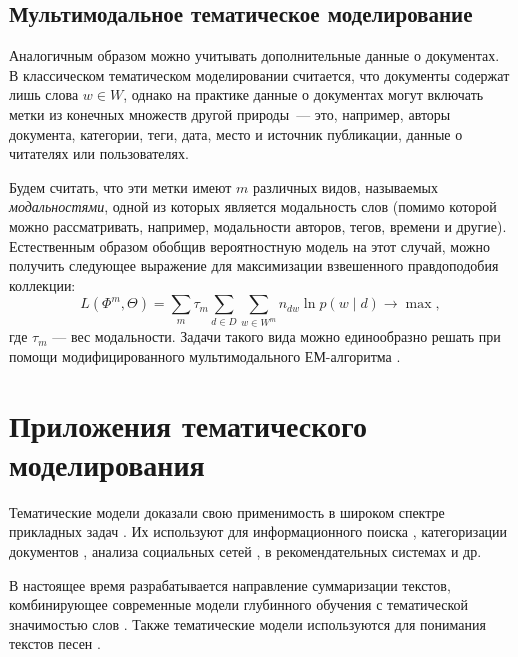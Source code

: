 \subsection{Мультимодальное тематическое моделирование}

Аналогичным образом можно учитывать дополнительные данные о документах.
В классическом тематическом моделировании считается, что документы содержат лишь слова $w \in W$, однако на практике данные о документах могут включать метки из конечных множеств другой природы~--- это, например, авторы документа, категории, теги, дата, место и источник публикации, данные о читателях или пользователях.

Будем считать, что эти метки имеют $m$ различных видов, называемых  \textit{модальностями}, одной из которых является модальность слов (помимо которой можно рассматривать, например, модальности авторов, тегов, времени и другие). Естественным образом обобщив вероятностную модель на этот случай, можно получить следующее выражение для максимизации взвешенного правдоподобия коллекции:
\[
    L(\Phi^m, \Theta) = \sum_m \tau_m \sum_{d\in D} \sum_{w \in W^m} n_{dw} \ln p(w \mid d) \rightarrow \max,
\]
где $\tau_m$ --- вес модальности.
Задачи такого вида можно единообразно решать при помощи модифицированного мультимодального ЕМ-алгоритма \cite{voron15nonbayesian}.

\section{Приложения тематического моделирования}


Тематические модели доказали свою применимость в широком спектре прикладных задач \cite{fntir2017applications}. Их используют для информационного поиска \cite{yi2009, wang2011}, категоризации документов \cite{rubin2012}, анализа социальных сетей \cite{varshney2014, pinto2016}, в рекомендательных системах \cite{wang2011,lee2015} и др.

В настоящее время разрабатывается направление суммаризации текстов, комбинирующее современные модели глубинного обучения с тематической значимостью слов \cite{narayan2018don,wang2018reinforced,lebanoff-etal-2019-scoring}. Также тематические модели используются для понимания текстов песен \cite{choi2015topic,fell2019song,watanabe2018modeling}. 

